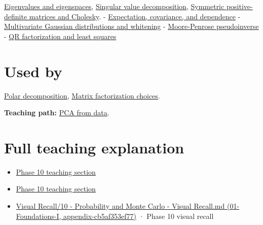 \hyperref[appendix-0b3be18411f9]{Eigenvalues and eigenspaces}, \hyperref[appendix-1fad5e7f36fa]{Singular value decomposition}, \hyperref[appendix-50d2ea3c9b26]{Symmetric positive-definite matrices and Cholesky}. - \hyperref[appendix-54c383df9992]{Expectation, covariance, and dependence} - \hyperref[appendix-12bbe185dbe5]{Multivariate Gaussian distributions and whitening} - \hyperref[appendix-541306fdbc1b]{Moore-Penrose pseudoinverse} - \hyperref[appendix-c3421e6b4f2c]{QR factorization and least squares}

\section{Used by}\label{appendix-ad175ef3c5bf-used-by}

\hyperref[appendix-73f5bcf7a462]{Polar decomposition}, \hyperref[appendix-221a483bec2d]{Matrix factorization choices}.

\textbf{Teaching path:} \href{Continuous\%20Notes/Computing\%20Foundations\%20-\%20From\%20Bits\%20to\%20C++\%20and\%20Systems\%20APIs\#PCA\%20turns\%20a\%20cloud\%20of\%20points\%20into\%20measured\%20variation}{PCA from data}.

\section{Full teaching explanation}\label{appendix-ad175ef3c5bf-full-teaching-explanation}

\begin{itemize}
\tightlist
\item
  \href{Continuous\%20Notes/Computing\%20Foundations\%20-\%20From\%20Bits\%20to\%20C++\%20and\%20Systems\%20APIs\#3.\%20Expected\%20values\%20describe\%20centers;\%20covariance\%20describes\%20dependence}{Phase 10 teaching section}
\item
  \href{Continuous\%20Notes/Computing\%20Foundations\%20-\%20From\%20Bits\%20to\%20C++\%20and\%20Systems\%20APIs\#5.\%20Waiting\%20times,\%20event\%20counts,\%20and\%20covariance\%20geometry}{Phase 10 teaching section}
\item
  \href{../01-Foundations-I/main.pdf\#nameddest=appendix-cb5af353ef77}{Visual Recall/10 - Probability and Monte Carlo - Visual Recall.md (01-Foundations-I, appendix-cb5af353ef77)} · Phase 10 visual recall
\end{itemize}
